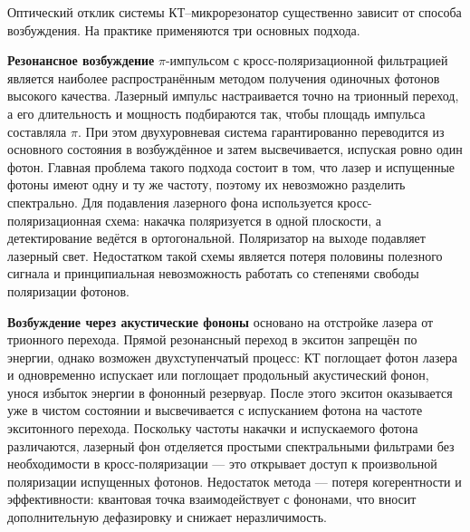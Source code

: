 \documentclass[11pt]{article}    %
\numberwithin{equation}{section}
\begin{document}
Оптический отклик системы КТ--микрорезонатор существенно зависит от способа
возбуждения. На практике применяются три основных подхода.

\textbf{Резонансное возбуждение} $\pi$-импульсом с кросс-поляризационной фильтрацией
\cite{matthiesen2012} является наиболее распространённым методом
получения одиночных фотонов высокого качества. Лазерный импульс настраивается
точно на трионный переход, а его длительность и мощность
подбираются так, чтобы площадь импульса составляла $\pi$. При этом
двухуровневая система гарантированно переводится из основного состояния в
возбуждённое и затем высвечивается, испуская ровно один фотон.
Главная проблема такого подхода состоит в том, что лазер и
испущенные фотоны имеют одну и ту же частоту, поэтому их невозможно разделить
спектрально. Для подавления лазерного фона используется кросс-поляризационная
схема: накачка поляризуется в одной плоскости, а детектирование
ведётся в ортогональной. Поляризатор на выходе подавляет
лазерный свет. Недостатком такой схемы является потеря половины
полезного сигнала и принципиальная невозможность работать со степенями свободы
поляризации фотонов.

\textbf{Возбуждение через акустические фононы} \cite{bennett2016, glassl2013} основано на
отстройке лазера от трионного перехода.
Прямой резонансный переход в экситон запрещён по энергии,
однако возможен двухступенчатый процесс: КТ поглощает фотон лазера и
одновременно испускает или поглощает продольный акустический фонон, унося избыток
энергии в фононный резервуар. После этого экситон оказывается уже в чистом
состоянии и высвечивается с испусканием фотона на частоте экситонного
перехода. Поскольку частоты накачки и испускаемого фотона различаются,
лазерный фон отделяется простыми спектральными фильтрами без необходимости в
кросс-поляризации --- это открывает доступ к произвольной поляризации
испущенных фотонов. Недостаток метода --- потеря когерентности и
эффективности: квантовая точка взаимодействует с
фононами, что вносит дополнительную дефазировку и снижает
неразличимость.
\end{document}

